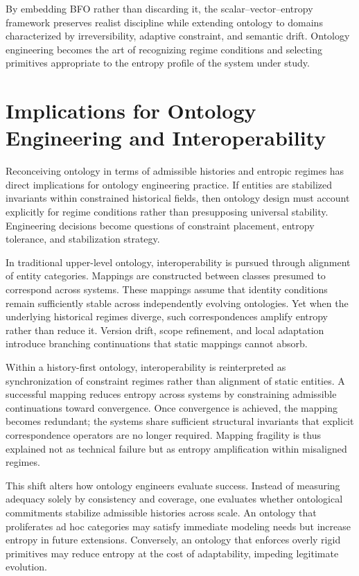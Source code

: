 \documentclass[12pt]{article}
\begin{document}
By embedding BFO rather than discarding it, the scalar–vector–entropy framework preserves realist discipline while extending ontology to domains characterized by irreversibility, adaptive constraint, and semantic drift. Ontology engineering becomes the art of recognizing regime conditions and selecting primitives appropriate to the entropy profile of the system under study.

\section{Implications for Ontology Engineering and Interoperability}

Reconceiving ontology in terms of admissible histories and entropic regimes has direct implications for ontology engineering practice. If entities are stabilized invariants within constrained historical fields, then ontology design must account explicitly for regime conditions rather than presupposing universal stability. Engineering decisions become questions of constraint placement, entropy tolerance, and stabilization strategy.

In traditional upper-level ontology, interoperability is pursued through alignment of entity categories. Mappings are constructed between classes presumed to correspond across systems. These mappings assume that identity conditions remain sufficiently stable across independently evolving ontologies. Yet when the underlying historical regimes diverge, such correspondences amplify entropy rather than reduce it. Version drift, scope refinement, and local adaptation introduce branching continuations that static mappings cannot absorb.

Within a history-first ontology, interoperability is reinterpreted as synchronization of constraint regimes rather than alignment of static entities. A successful mapping reduces entropy across systems by constraining admissible continuations toward convergence. Once convergence is achieved, the mapping becomes redundant; the systems share sufficient structural invariants that explicit correspondence operators are no longer required. Mapping fragility is thus explained not as technical failure but as entropy amplification within misaligned regimes.

This shift alters how ontology engineers evaluate success. Instead of measuring adequacy solely by consistency and coverage, one evaluates whether ontological commitments stabilize admissible histories across scale. An ontology that proliferates ad hoc categories may satisfy immediate modeling needs but increase entropy in future extensions. Conversely, an ontology that enforces overly rigid primitives may reduce entropy at the cost of adaptability, impeding legitimate evolution.
\end{document}
